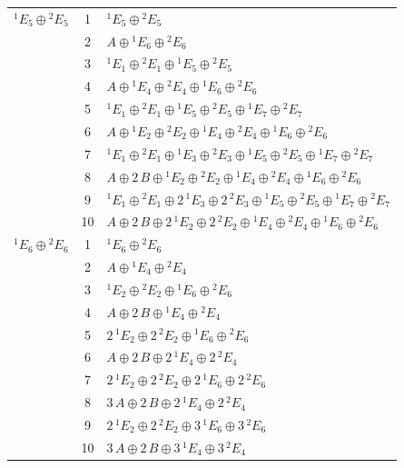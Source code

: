\documentclass[11pt]{article}
\begin{document}
\begin{longtable}{l c p{}}
\hline
${}^{1}E_{5}\oplus {}^{2}E_{5}$ & 1 & ${}^{1}E_{5}\oplus {}^{2}E_{5}$\\
 & 2 & $A\oplus {}^{1}E_{6}\oplus {}^{2}E_{6}$\\
 & 3 & ${}^{1}E_{1}\oplus {}^{2}E_{1}\oplus {}^{1}E_{5}\oplus {}^{2}E_{5}$\\
 & 4 & $A\oplus {}^{1}E_{4}\oplus {}^{2}E_{4}\oplus {}^{1}E_{6}\oplus {}^{2}E_{6}$\\
 & 5 & ${}^{1}E_{1}\oplus {}^{2}E_{1}\oplus {}^{1}E_{5}\oplus {}^{2}E_{5}\oplus {}^{1}E_{7}\oplus {}^{2}E_{7}$\\
 & 6 & $A\oplus {}^{1}E_{2}\oplus {}^{2}E_{2}\oplus {}^{1}E_{4}\oplus {}^{2}E_{4}\oplus {}^{1}E_{6}\oplus {}^{2}E_{6}$\\
 & 7 & ${}^{1}E_{1}\oplus {}^{2}E_{1}\oplus {}^{1}E_{3}\oplus {}^{2}E_{3}\oplus {}^{1}E_{5}\oplus {}^{2}E_{5}\oplus {}^{1}E_{7}\oplus {}^{2}E_{7}$\\
 & 8 & $A\oplus 2\,B\oplus {}^{1}E_{2}\oplus {}^{2}E_{2}\oplus {}^{1}E_{4}\oplus {}^{2}E_{4}\oplus {}^{1}E_{6}\oplus {}^{2}E_{6}$\\
 & 9 & ${}^{1}E_{1}\oplus {}^{2}E_{1}\oplus 2\,{}^{1}E_{3}\oplus 2\,{}^{2}E_{3}\oplus {}^{1}E_{5}\oplus {}^{2}E_{5}\oplus {}^{1}E_{7}\oplus {}^{2}E_{7}$\\
 & 10 & $A\oplus 2\,B\oplus 2\,{}^{1}E_{2}\oplus 2\,{}^{2}E_{2}\oplus {}^{1}E_{4}\oplus {}^{2}E_{4}\oplus {}^{1}E_{6}\oplus {}^{2}E_{6}$\\
\hline
${}^{1}E_{6}\oplus {}^{2}E_{6}$ & 1 & ${}^{1}E_{6}\oplus {}^{2}E_{6}$\\
 & 2 & $A\oplus {}^{1}E_{4}\oplus {}^{2}E_{4}$\\
 & 3 & ${}^{1}E_{2}\oplus {}^{2}E_{2}\oplus {}^{1}E_{6}\oplus {}^{2}E_{6}$\\
 & 4 & $A\oplus 2\,B\oplus {}^{1}E_{4}\oplus {}^{2}E_{4}$\\
 & 5 & $2\,{}^{1}E_{2}\oplus 2\,{}^{2}E_{2}\oplus {}^{1}E_{6}\oplus {}^{2}E_{6}$\\
 & 6 & $A\oplus 2\,B\oplus 2\,{}^{1}E_{4}\oplus 2\,{}^{2}E_{4}$\\
 & 7 & $2\,{}^{1}E_{2}\oplus 2\,{}^{2}E_{2}\oplus 2\,{}^{1}E_{6}\oplus 2\,{}^{2}E_{6}$\\
 & 8 & $3\,A\oplus 2\,B\oplus 2\,{}^{1}E_{4}\oplus 2\,{}^{2}E_{4}$\\
 & 9 & $2\,{}^{1}E_{2}\oplus 2\,{}^{2}E_{2}\oplus 3\,{}^{1}E_{6}\oplus 3\,{}^{2}E_{6}$\\
 & 10 & $3\,A\oplus 2\,B\oplus 3\,{}^{1}E_{4}\oplus 3\,{}^{2}E_{4}$\\

\end{longtable}
\end{document}
